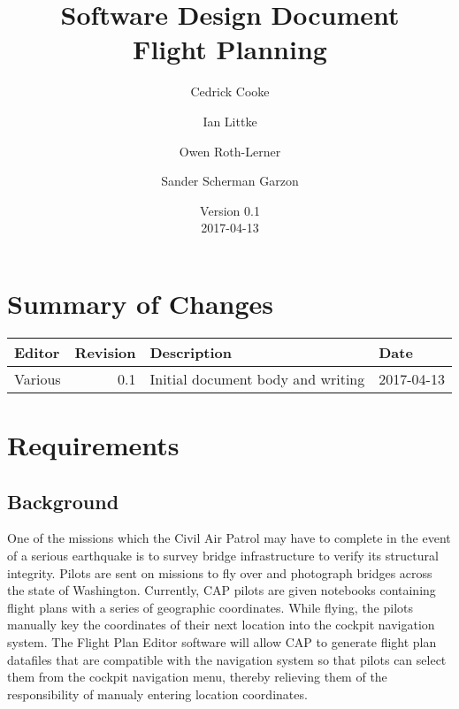 \documentclass[12pt, letterpaper]{article}
\title{Software Design Document \\
Flight Planning
}
\author{ Cedrick Cooke
    \and Ian Littke
    \and Owen Roth-Lerner
    \and Sander Scherman Garzon
}
\date{Version 0.1 \\ 2017-04-13}
\begin{document}
\maketitle

\tableofcontents

\section*{Summary of Changes}
\begin{tabularx}{\textwidth}{|l|r|X|l|}
\hline
Editor & Revision & Description & Date \\ \hline \hline
Various & 0.1 & Initial document body and writing & 2017-04-13 \\ \hline
\end{tabularx}

\section{Requirements}
\subsection{Background}
One of the missions which the Civil Air Patrol may have to complete in the event of a serious earthquake is to survey bridge infrastructure to verify its structural integrity.  Pilots are sent on missions to fly over and photograph bridges across the state of Washington.  Currently, CAP pilots are given notebooks containing flight plans with a series of geographic coordinates.  While flying, the pilots manually key the coordinates of their next location into the cockpit navigation system.  The Flight Plan Editor software will allow CAP to generate flight plan datafiles that are compatible with the navigation system so that pilots can select them from the cockpit navigation menu, thereby relieving them of the responsibility of manualy entering location coordinates.



{}

\end{document}
